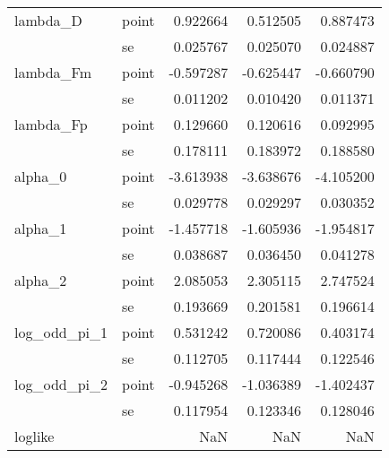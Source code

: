 \begin{tabular}{llrrr}
lambda\_D & point &  0.922664 &   0.512505 &    0.887473 \\
        & se &  0.025767 &   0.025070 &    0.024887 \\
lambda\_Fm & point & -0.597287 &  -0.625447 &   -0.660790 \\
        & se &  0.011202 &   0.010420 &    0.011371 \\
lambda\_Fp & point &  0.129660 &   0.120616 &    0.092995 \\
        & se &  0.178111 &   0.183972 &    0.188580 \\
alpha\_0 & point & -3.613938 &  -3.638676 &   -4.105200 \\
        & se &  0.029778 &   0.029297 &    0.030352 \\
alpha\_1 & point & -1.457718 &  -1.605936 &   -1.954817 \\
        & se &  0.038687 &   0.036450 &    0.041278 \\
alpha\_2 & point &  2.085053 &   2.305115 &    2.747524 \\
        & se &  0.193669 &   0.201581 &    0.196614 \\
log\_odd\_pi\_1 & point &  0.531242 &   0.720086 &    0.403174 \\
        & se &  0.112705 &   0.117444 &    0.122546 \\
log\_odd\_pi\_2 & point & -0.945268 &  -1.036389 &   -1.402437 \\
        & se &  0.117954 &   0.123346 &    0.128046 \\
loglike &    &       NaN &        NaN &         NaN \\
\bottomrule
\end{tabular}
